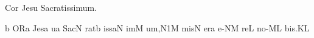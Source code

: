 
\beginhymn Cor Jesu Sacratissimum.

\Internote
\nosolesmescustos
\initiumgregorianum
\znotes\fissum{3pt}\bmolle b\en
{}%
\sgn {}OR\punctum a\egn
\spatium
\begingroup
\bgenerale
\sgn Jes\punctum a\egn
\sgn {}u{}\punctum a\egn
\spatium
\sgn Sac\punctum N\egn
\sgn rat\punctum b\egn
\sgn {}i{ss}\clivis aN\egn
\sgn {}im\punctum M\egn
\sgn {}u{m,}\episem N1\punctum M\egn
\spatium
\divisiominor
\spatium
\sgn mis\punctum N\egn
\sgn {}er\punctum a\egn
\sgn {}e-\clivis NM\egn
\sgn re{}\punctum L\egn
\spatium
\sgn no-\clivis ML\egn
\sgn bi{s.}\punctum K\augmentum L\egn
\spatium
\endgroup
\Finisgregoriana

\bigskip

  
